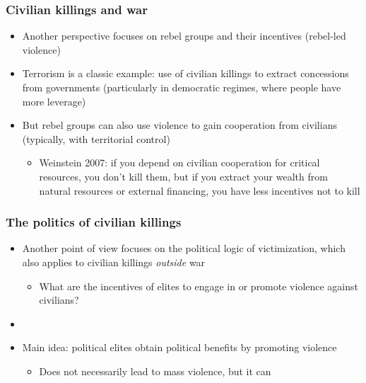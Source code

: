\documentclass[aspectratio=43]{beamer}
\begin{document}
\begin{frame}
\frametitle{Civilian killings and war}
\centering

\begin{itemize}
  \item<1-> Another perspective focuses on rebel groups and their incentives (rebel-led violence)
  \item<2-> Terrorism is a classic example: use of civilian killings to extract concessions from governments (particularly in democratic regimes, where people have more leverage)
  \item<3-> But rebel groups can also use violence to gain cooperation from civilians (typically, with territorial control)
  \begin{itemize}
    \item Weinstein 2007: if you depend on civilian cooperation for critical resources, you don't kill them, but if you extract your wealth from natural resources or external financing, you have less incentives not to kill
  \end{itemize}
\end{itemize}

\end{frame}

\begin{frame}
\frametitle{The politics of civilian killings}
\centering

\begin{itemize}
  \item<1-> Another point of view focuses on the political logic of victimization, which also applies to civilian killings \textit{outside} war
  \begin{itemize}
    \item What are the incentives of elites to engage in or promote violence against civilians?
  \end{itemize}
  \item[]
  \item<2-> Main idea: political elites obtain political benefits by promoting violence
  \begin{itemize}
    \item Does not necessarily lead to mass violence, but it can
  \end{itemize}
\end{itemize}

\end{frame}
\end{document}
